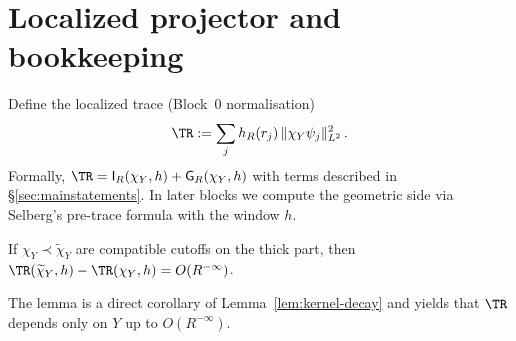 \section{Localized projector and bookkeeping}\label{sec:projector}

Define the localized trace (Block~0 normalisation)
\[
  \TR := \sum_{j} h_R(r_j)\,\|\chi_Y \psi_j\|_{L^2}^2\,.
\]
Formally, $\TR = \mathsf{I}_R(\chi_Y,h)+\mathsf{G}_R(\chi_Y,h)$ with terms described
in \S\ref{sec:mainstatements}. In later blocks we compute the geometric side
via Selberg’s pre-trace formula with the window $h$.

\begin{lemma}\label{lem:proj-stability}
If $\chi_Y\prec \widetilde{\chi}_Y$ are compatible cutoffs on the thick part,
then $\TR(\widetilde{\chi}_Y,h)-\TR(\chi_Y,h)=O(R^{-\infty})$.
\end{lemma}

\begin{remark}
The lemma is a direct corollary of Lemma~\ref{lem:kernel-decay} and yields that
$\TR$ depends only on $Y$ up to $O(R^{-\infty})$.
\end{remark}
